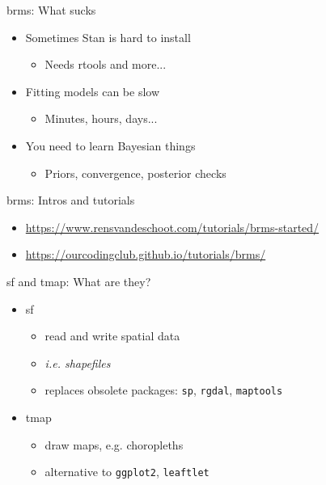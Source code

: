 \documentclass[aspectratio=169,12pt]{beamer} %
\begin{document}
\begin{frame}{brms: What sucks}
	\begin{itemize}
		\item Sometimes Stan is hard to install
		\begin{itemize}
			\item Needs rtools and more...
		\end{itemize}
		\item Fitting models can be slow
		\begin{itemize}
			\item Minutes, hours, days...
		\end{itemize}
		\item You need to learn Bayesian things
		\begin{itemize}
			\item Priors, convergence, posterior checks
		\end{itemize}
	\end{itemize}
\end{frame}

\begin{frame}{brms: Intros and tutorials}
	\begin{itemize}
		\item \scriptsize{\url{https://www.rensvandeschoot.com/tutorials/brms-started/}}
		\item \scriptsize{\url{https://ourcodingclub.github.io/tutorials/brms/}}
	\end{itemize}
\end{frame}


\begin{frame}{sf and tmap: What are they?}
	\begin{itemize}
		\item sf
		\begin{itemize}
			\item read and write spatial data
			\item \emph{i.e. shapefiles}
			\item replaces obsolete packages: \texttt{sp},
				\texttt{rgdal}, \texttt{maptools}
		\end{itemize}
		\item tmap
		\begin{itemize}
			\item draw maps, e.g. choropleths
			\item alternative to \texttt{ggplot2}, \texttt{leaftlet}
		\end{itemize}
	\end{itemize}
\end{frame}
\end{document}

